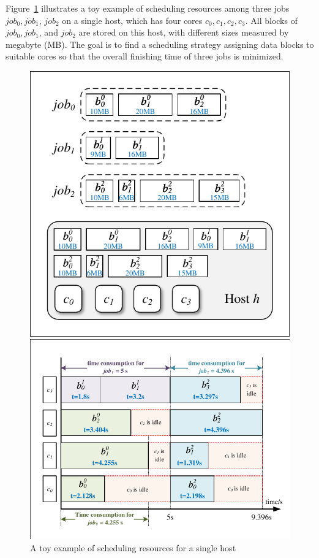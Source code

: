 \documentclass{llncs}
\begin{document}
Figure~\ref{Fig-SingleHostExample} illustrates a toy example of scheduling resources among three jobs $job_0, job_1$, $job_2$ on a single host, which has four cores $c_0, c_1, c_2, c_3$. All blocks of $job_0, job_1$, and $job_2$ are stored on this host, with different sizes measured by megabyte (MB). The goal is to find a scheduling strategy assigning data blocks to suitable cores so that the overall finishing time of three jobs is minimized.


\begin{figure}[htbp]
\centering
\begin{minipage}[t]{0.38\textwidth}
\centering
\includegraphics[width=\textwidth]{Fig-SingleHostExample.pdf}
\caption{A toy example of scheduling resources for a single host}
\label{Fig-SingleHostExample}
\end{minipage}
\begin{minipage}[t]{0.6\textwidth}
\centering
\includegraphics[width=\textwidth]{Fig-SingleHostResult.pdf}

\end{minipage}
\end{figure}
\end{document}
